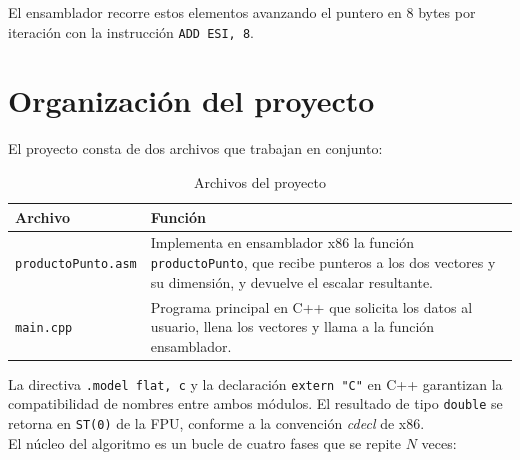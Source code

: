 \documentclass[12pt, letterpaper]{article}
\begin{document}
El ensamblador recorre estos elementos avanzando el puntero en 8 bytes por iteración con la instrucción \texttt{ADD ESI, 8}.

\section{Organización del proyecto}

El proyecto consta de dos archivos que trabajan en conjunto:

\begin{table}[H]
    \centering
    \begin{tabular}{@{}lp{9cm}@{}}
        \toprule
        \textbf{Archivo} & \textbf{Función} \\
        \midrule
        \texttt{productoPunto.asm} & Implementa en ensamblador x86 la función \texttt{productoPunto}, que recibe punteros a los dos vectores y su dimensión, y devuelve el escalar resultante. \\
        \texttt{main.cpp}          & Programa principal en C++ que solicita los datos al usuario, llena los vectores y llama a la función ensamblador. \\
        \bottomrule
    \end{tabular}
    \caption{Archivos del proyecto}
\end{table}

La directiva \texttt{.model flat, c} y la declaración \texttt{extern "C"} en C++ garantizan la compatibilidad de nombres entre ambos módulos. El resultado de tipo \texttt{double} se retorna en \texttt{ST(0)} de la FPU, conforme a la convención \textit{cdecl} de x86.\\

El núcleo del algoritmo es un bucle de cuatro fases que se repite $N$ veces:
\end{document}

